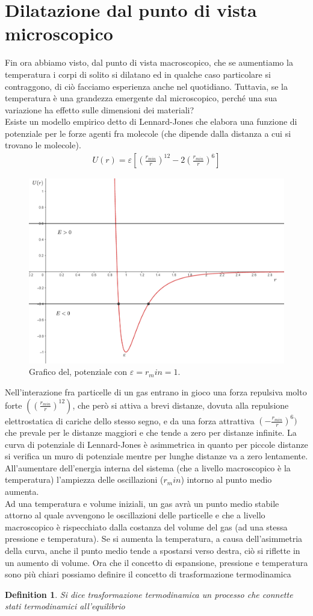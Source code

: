 \documentclass[10pt,a4paper]{article}
\newtheorem{definition}{Definition}
\begin{document}
\section{Dilatazione dal punto di vista microscopico}
Fin ora abbiamo visto, dal punto di vista macroscopico, che se aumentiamo la temperatura i corpi di solito si dilatano ed in qualche caso particolare si contraggono, di ciò facciamo esperienza anche nel quotidiano. Tuttavia, se la temperatura è una grandezza emergente dal microscopico, perché una sua variazione ha effetto sulle dimensioni dei materiali?\\
Esiste un modello empirico detto di Lennard-Jones che elabora una funzione di potenziale per le forze agenti fra molecole (che dipende dalla distanza a cui si trovano le molecole). 
\begin{align*}
	U(r) = \varepsilon[(\frac{r_{min}}{r})^{12}-2(\frac{r_{min}}{r})^6]
\end{align*}
\begin{figure}[h!]
	\centering
	\includegraphics[width=0.6\linewidth]{Lennard-Jones_model}
	\caption{Grafico del, potenziale con $\varepsilon =r_min = 1$.}
	\label{fig:lennard-jonesmodel}
\end{figure}
\FloatBarrier
Nell'interazione fra particelle di un gas entrano in gioco una forza repulsiva molto forte $((\frac{r_{min}}{r})^{12})$, che però si attiva a brevi distanze, dovuta alla repulsione elettrostatica di cariche dello stesso segno, e da una forza attrattiva $(-\frac{r_{min}}{r})^6)$ che prevale per le distanze maggiori e che tende a zero per distanze infinite. La curva di potenziale di Lennard-Jones è asimmetrica in quanto per piccole distanze si verifica un muro di potenziale mentre per lunghe distanze va a zero lentamente. All'aumentare dell'energia interna del sistema (che a livello macroscopico è la temperatura) l'ampiezza delle oscillazioni ($r_min$) intorno al punto medio aumenta.\\
Ad una temperatura e volume iniziali, un gas avrà un punto medio stabile attorno al quale avvengono le oscillazioni delle particelle e che a livello macroscopico è rispecchiato dalla costanza del volume del gas (ad una stessa pressione e temperatura). Se si aumenta la temperatura, a causa dell'asimmetria della curva, anche il punto medio tende a spostarsi verso destra, ciò si riflette in un aumento di volume. Ora che il concetto di espansione, pressione e temperatura sono più chiari possiamo definire il concetto di trasformazione termodinamica
\begin{definition}
	Si dice trasformazione termodinamica un processo che connette stati termodinamici all'equilibrio
\end{definition}
\end{document}
